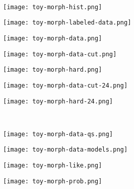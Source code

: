 \documentclass{beamer}
\begin{document}
\whiteonblack
\begin{frame}
~
\end{frame}
\blackonwhite

\begin{frame}
\texttt{[image: toy-morph-hist.png]}
\end{frame}

\begin{frame}
\texttt{[image: toy-morph-labeled-data.png]}
\end{frame}

\begin{frame}
\texttt{[image: toy-morph-data.png]}
\end{frame}

\begin{frame}
\texttt{[image: toy-morph-data-cut.png]}
\end{frame}

\begin{frame}
\texttt{[image: toy-morph-hard.png]}
\end{frame}

\begin{frame}
\texttt{[image: toy-morph-data-cut-24.png]}
\end{frame}

\begin{frame}
\texttt{[image: toy-morph-hard-24.png]}
\end{frame}

\whiteonblack
\begin{frame}
~
\end{frame}
\blackonwhite

\begin{frame}
\texttt{[image: toy-morph-data-qs.png]}
\end{frame}

\begin{frame}
\texttt{[image: toy-morph-data-models.png]}
\end{frame}

\begin{frame}
\texttt{[image: toy-morph-like.png]}
\end{frame}

\begin{frame}
\texttt{[image: toy-morph-prob.png]}
\end{frame}
\end{document}
